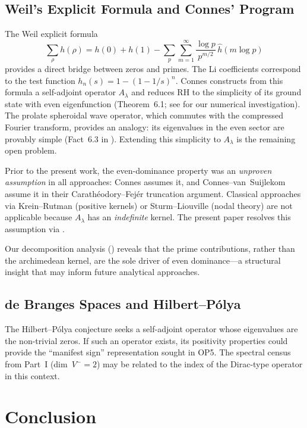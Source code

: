 \documentclass[12pt,a4paper]{article}
\theoremstyle{definition}
\theoremstyle{remark}
\begin{document}
\subsection{Weil's Explicit Formula and Connes' Program}
The Weil explicit formula
\[ \sum_\rho h(\rho) = h(0) + h(1) - \sum_p \sum_{m=1}^\infty \frac{\log p}{p^{m/2}}\,\hat{h}(m\log p) \]
provides a direct bridge between zeros and primes. The Li coefficients correspond to the test function $h_n(s) = 1-(1-1/s)^n$. Connes \cite{Connes2025} constructs from this formula a self-adjoint operator $A_\lambda$ and reduces RH to the simplicity of its ground state with even eigenfunction (Theorem~6.1; see  for our numerical investigation). The prolate spheroidal wave operator, which commutes with the compressed Fourier transform, provides an analogy: its eigenvalues in the even sector are provably simple (Fact~6.3 in \cite{Connes2025}). Extending this simplicity to $A_\lambda$ is the remaining open problem.

Prior to the present work, the even-dominance property was an \emph{unproven assumption} in all approaches: Connes \cite{Connes2025} assumes it, and Connes--van~Suijlekom \cite{ConnesvS2025} assume it in their Carath\'eodory--Fej\'er truncation argument. Classical approaches via Krein--Rutman (positive kernels) or Sturm--Liouville (nodal theory) are not applicable because $A_\lambda$ has an \emph{indefinite} kernel. The present paper resolves this assumption via .

Our decomposition analysis () reveals that the prime contributions, rather than the archimedean kernel, are the sole driver of even dominance---a structural insight that may inform future analytical approaches.

\subsection{de Branges Spaces and Hilbert--P\'olya}
The Hilbert--P\'olya conjecture seeks a self-adjoint operator whose eigenvalues are the non-trivial zeros. If such an operator exists, its positivity properties could provide the ``manifest sign'' representation sought in OP5. The spectral census from Part~I (dim~$V^- = 2$) may be related to the index of the Dirac-type operator in this context.


\section{Conclusion}
\end{document}
